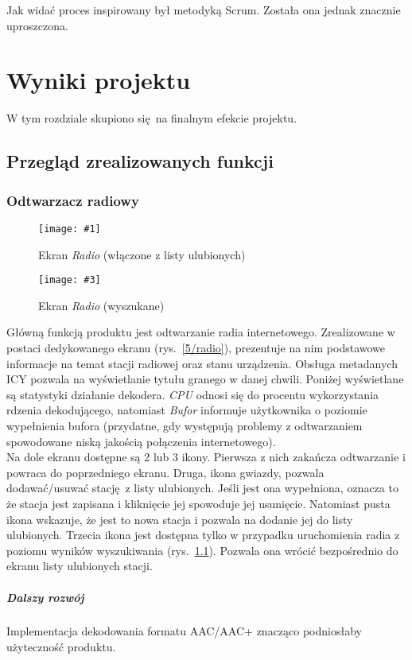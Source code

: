 \documentclass[polish]{aghengthesis}
\newcommand{\imgintss}[5]{
	\begin{figure}[{#5}]
		\centering
		\begin{minipage}{.45\textwidth}
			\centering
			\texttt{[image: \#1]}
			\caption{#2}
			\label{#1}
		\end{minipage}%
		\hfill
		\begin{minipage}{.45\textwidth}
			\centering
			\texttt{[image: \#3]}
			\caption{#4}
			\label{#3}
		\end{minipage}
	\end{figure}
}
\newcommand{\imghss}[4]{\imgintss{#1}{#2}{#3}{#4}{H}}
\begin{document}
		 Jak widać proces inspirowany był metodyką Scrum. Została ona jednak znacznie uproszczona.
	 	
\chapter{Wyniki projektu}
	W tym rozdziale skupiono się na finalnym efekcie projektu.
	
	\section{Przegląd zrealizowanych funkcji}
	
		\subsection{Odtwarzacz radiowy}
			\imghss{5/radio}{Ekran \textit{Radio} (włączone z listy ulubionych)}{5/radio_search}{Ekran \textit{Radio} (wyszukane)}
			
			Główną funkcją produktu jest odtwarzanie radia internetowego. Zrealizowane w postaci dedykowanego ekranu (rys.~\ref{5/radio}), prezentuje na nim podstawowe informacje na temat stacji radiowej oraz stanu urządzenia. Obsługa metadanych ICY pozwala na wyświetlanie tytułu granego w danej chwili. Poniżej wyświetlane są statystyki działanie dekodera. \textit{CPU} odnosi się do procentu wykorzystania rdzenia dekodującego, natomiast \textit{Bufor} informuje użytkownika o poziomie wypełnienia bufora (przydatne, gdy występują problemy z odtwarzaniem spowodowane niską jakością połączenia internetowego).
			$ $\\
			
			Na dole ekranu dostępne są 2 lub 3 ikony. Pierwsza z nich zakańcza odtwarzanie i powraca do poprzedniego ekranu. Druga, ikona gwiazdy, pozwala dodawać/usuwać stację z listy ulubionych. Jeśli jest ona wypełniona, oznacza to że stacja jest zapisana i kliknięcie jej spowoduje jej usunięcie. Natomiast pusta ikona wskazuje, że jest to nowa stacja i pozwala na dodanie jej do listy ulubionych. Trzecia ikona jest dostępna tylko w przypadku uruchomienia radia z poziomu wyników wyszukiwania (rys.~\ref{5/radio_search}). Pozwala ona wrócić bezpośrednio do ekranu listy ulubionych stacji.
		
			\paragraph{Dalszy rozwój}
				Implementacja dekodowania formatu AAC/AAC+ znacząco podniosłaby użyteczność produktu.
			
\end{document}
